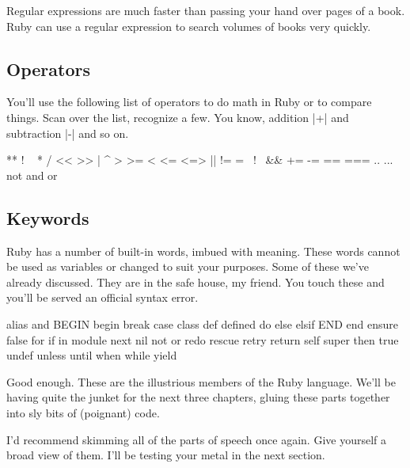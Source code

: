 \documentclass[12pt,twoside]{report}
\begin{document}
Regular expressions are much faster than passing your hand over pages
of a book.  Ruby can use a regular expression to search volumes of
books very quickly.



\subsection{Operators}



You'll use the following list of operators to do math in Ruby or to
compare things. Scan over the list, recognize a few.  You know,
addition \rubyinline|+| and subtraction
\rubyinline|-| and so on.


\begin{consolecode}

  ** !  ~  *  /  %
  << >> |  ^  >  >= <  <= <=>
  || != =~ !~ && += -= == ===
  .. ... not and or

\end{consolecode}




\subsection{Keywords}



Ruby has a number of built-in words, imbued with meaning.  These words
cannot be used as variables or changed to suit your purposes.  Some of
these we've already discussed.  They are in the safe house, my friend.
You touch these and you'll be served an official syntax error.


\begin{consolecode}

  alias   and     BEGIN   begin   break   case    class   def     defined 
  do      else    elsif   END     end     ensure  false   for     if 
  in      module  next    nil     not     or      redo    rescue  retry
  return  self    super   then    true    undef   unless  until   when 
  while   yield

\end{consolecode}


Good enough.  These are the illustrious members of the Ruby language.
We'll be having quite the junket for the next three chapters, gluing
these parts together into sly bits of (poignant) code.

I'd recommend skimming all of the parts of speech once again.  Give
yourself a broad view of them.  I'll be testing your metal in the next
section.
\end{document}
